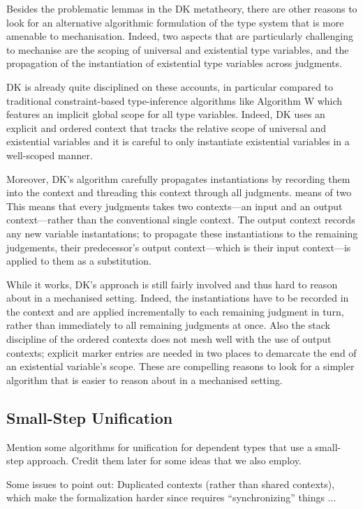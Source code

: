 Besides the problematic lemmas in the DK metatheory, there are other reasons to
look for an alternative algorithmic formulation of the type system that is more
amenable to mechanisation. Indeed, two aspects that are particularly
challenging to mechanise are the scoping of universal and existential type
variables, and the propagation of the instantiation of existential type
variables across judgments. 

DK is already quite disciplined on these accounts, in particular compared to
traditional constraint-based type-inference algorithms like Algorithm W which
features an implicit global scope for all type variables. Indeed, DK uses an
explicit and ordered context that tracks the relative scope of universal and
existential variables and it is careful to only instantiate existential
variables in a well-scoped manner.

Moreover, DK's algorithm carefully propagates instantiations by recording them
into the context and threading this context through all judgments.  means of
two This means that every judgments takes two contexts---an input and an output
context---rather than the conventional single context. The output context
records any new variable instantations; to propagate these instantiations to
the remaining judgements, their predecessor's output context---which is their
input context---is applied to them as a substitution.

While it works, DK's approach is still fairly involved and thus hard to reason
about in a mechanised setting. Indeed, the instantiations have to be recorded
in the context and are applied incrementally to each remaining judgment in
turn, rather than immediately to all remaining judgments at once. Also the
stack discipline of the ordered contexts does not mesh well with the use of
output contexts; explicit marker entries are needed in two places to
demarcate the end of an existential variable's scope. These are compelling 
reasons to look for a simpler algorithm that is easier to reason about in a 
mechanised setting.

\subsection{Small-Step Unification} Mention some algorithms for unification for 
dependent types that use a small-step approach. Credit them later for some ideas that 
we also employ.

Some issues to point out: Duplicated contexts (rather than shared contexts), which make 
the formalization harder since requires ``synchronizing'' things ...

